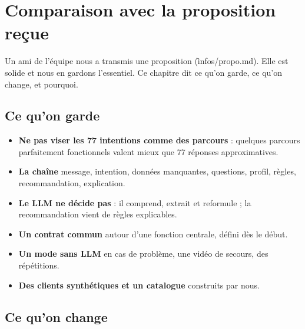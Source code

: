 \chapter{Comparaison avec la proposition reçue}
\label{ch:comparaison}

Un ami de l'équipe nous a transmis une proposition (\f{infos/propo.md}). Elle est solide et nous
en gardons l'essentiel. Ce chapitre dit ce qu'on garde, ce qu'on change, et pourquoi.

\section{Ce qu'on garde}

\begin{itemize}
  \item \textbf{Ne pas viser les 77 intentions comme des parcours} : quelques parcours
        parfaitement fonctionnels valent mieux que 77 réponses approximatives.
  \item \textbf{La chaîne} message, intention, données manquantes, questions, profil, règles,
        recommandation, explication.
  \item \textbf{Le LLM ne décide pas} : il comprend, extrait et reformule ; la recommandation vient
        de règles explicables.
  \item \textbf{Un contrat commun} autour d'une fonction centrale, défini dès le début.
  \item \textbf{Un mode sans LLM} en cas de problème, une vidéo de secours, des répétitions.
  \item \textbf{Des clients synthétiques et un catalogue} construits par nous.
\end{itemize}

\section{Ce qu'on change}

